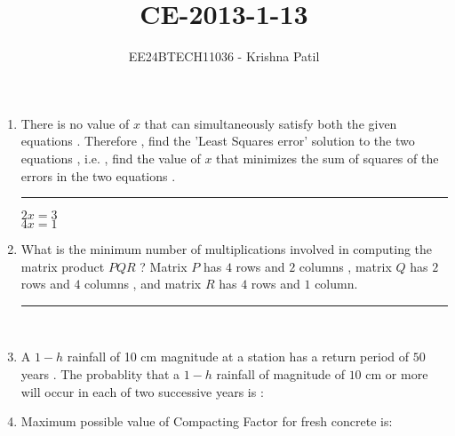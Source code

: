 \documentclass[journal]{IEEEtran}
\begin{document}

\vspace{3cm}

\title{CE-2013-1-13}
\author{EE24BTECH11036 - Krishna Patil}
{\let\newpage\relax\maketitle}
\begin{enumerate}
\item There is no value of $x$ that can simultaneously satisfy both the given equations . Therefore , find the 'Least Squares error' solution to the two equations , i.e. , find the value of $x$ that minimizes the sum of squares of the errors in the two equations . \rule{2cm}{0.4pt}
 \begin{center}
     $2x=3$ \\ $4x=1$ \\
 \end{center}
\item What is the minimum number of multiplications involved in computing the matrix product $PQR$ ? Matrix $P$ has $4$ rows and $2$ columns ,  matrix $Q$ has $2$ rows and $4$ columns , and matrix $R$ has $4$ rows and $1$ column. \rule{2cm}{0.4pt} \\
\item A $1-h$ rainfall of 10 cm magnitude at a station has a return period of $50$ years . The probablity that a $1-h$ rainfall of magnitude of $10$ cm or more will occur in each of two successive years is :  
\begin{enumerate}
\end{enumerate}
\item Maximum possible value of Compacting Factor for fresh  concrete is:
\begin{enumerate}
\end{enumerate}
\end{enumerate}
\end{document}
